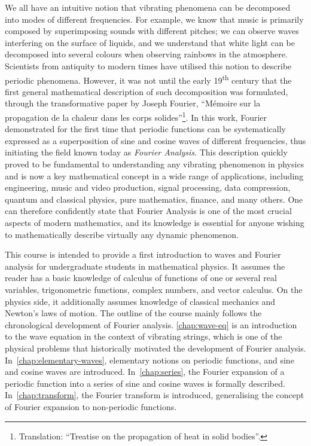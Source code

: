 We all have an intuitive notion that vibrating phenomena can be decomposed into modes of
different frequencies. For example, we know that music is primarily composed by
superimposing sounds with different pitches; we can observe waves interfering on the
surface of liquids, and we understand that white light can be decomposed into several
colours when observing rainbows in the atmosphere. Scientists from antiquity to modern
times have utilised this notion to describe periodic phenomena. However, it was not until
the early 19\textsuperscript{th} century that the first general mathematical description
of such decomposition was formulated, through the transformative paper by Joseph Fourier,
``Mémoire sur la propagation de la chaleur dans les corps solides''\footnote{Translation:
``Treatise on the propagation of heat in solid bodies''.}. In this work, Fourier
demonstrated for the first time that periodic functions can be systematically expressed as a
superposition of sine and cosine waves of different frequencies, thus initiating the field
known today as \emph{Fourier Analysis}. This description quickly proved to be fundamental
to understanding any vibrating phenomenon in physics and is now a key mathematical concept
in a wide range of applications, including engineering, music and video production, signal
processing, data compression, quantum and classical physics, pure mathematics, finance, and many others. One
can therefore confidently state that Fourier Analysis is one of the most crucial aspects
of modern mathematics, and its knowledge is essential for anyone wishing to mathematically
describe virtually any dynamic phenomenon.

This course is intended to provide a first introduction to waves and Fourier analysis for
undergraduate students in mathematical physics. It assumes the reader has a basic
knowledge of calculus of functions of one or several real variables, trigonometric
functions, complex numbers, and vector calculus. On the physics side, it additionally
assumes knowledge of classical mechanics and Newton's laws of motion. The outline of the
course mainly follows the chronological development of Fourier analysis.
\cref{chap:wave-eq} is an introduction to the wave equation in the context of vibrating
strings, which is one of the physical problems that historically motivated the development
of Fourier analysis. In~\cref{chap:elementary-waves}, elementary notions on periodic
functions, and sine and cosine waves are introduced. In~\cref{chap:series}, the Fourier
expansion of a periodic function into a series of sine and cosine waves is formally
described. In~\cref{chap:transform}, the Fourier transform is introduced, generalising the
concept of Fourier expansion to non-periodic functions.
